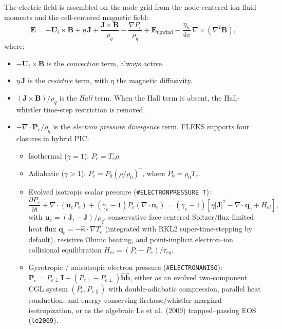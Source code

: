 \documentclass[a4paper, 11pt]{article}
\begin{document}
The electric field is assembled on the node grid from the node-centered ion fluid moments and the cell-centered magnetic field:
\begin{equation}
\mathbf{E} = -\mathbf{U}_i \times \mathbf{B}
           + \eta\,\mathbf{J}
           + \frac{\mathbf{J} \times \mathbf{B}}{\rho_q}
           - \frac{\nabla P_e}{\rho_q}
           + \mathbf{E}_{\text{upwind}}
           - \frac{\eta_h}{4\pi}\,\nabla \times (\nabla^2 \mathbf{B}),
\label{eq:ohmslaw}
\end{equation}
where:
\begin{itemize}
  \item $-\mathbf{U}_i \times \mathbf{B}$ is the \emph{convection} term, always active.
  \item $\eta\,\mathbf{J}$ is the \emph{resistive} term, with $\eta$ the magnetic diffusivity.
  \item $(\mathbf{J}\times\mathbf{B})/\rho_q$ is the \emph{Hall} term. When the Hall term is absent, the Hall-whistler time-step restriction is removed.
  \item $-\nabla\cdot\mathbf{P}_e/\rho_q$ is the \emph{electron pressure divergence} term. FLEKS supports four closures in hybrid PIC:
  \begin{itemize}
    \item Isothermal ($\gamma=1$): $P_e = T_e \rho$.
    \item Adiabatic ($\gamma > 1$): $P_e = P_0 (\rho/\rho_0)^\gamma$, where $P_0 = \rho_0 T_e$.
    \item Evolved isotropic scalar pressure (\texttt{\#ELECTRONPRESSURE T}):
    \begin{equation}
    \frac{\partial P_e}{\partial t} + \nabla\cdot(\mathbf{u}_e P_e) + (\gamma_e - 1) P_e (\nabla\cdot\mathbf{u}_e) = (\gamma_e - 1)\left[\eta |\mathbf{J}|^2 - \nabla\cdot\mathbf{q}_e + H_{ei}\right],
    \end{equation}
    with $\mathbf{u}_e = (\mathbf{J}_i - \mathbf{J})/\rho_q$, conservative face-centered Spitzer/flux-limited heat flux $\mathbf{q}_e = -\hat{\boldsymbol{\kappa}}\cdot\nabla T_e$ (integrated with RKL2 super-time-stepping by default), resistive Ohmic heating, and point-implicit electron--ion collisional equilibration $H_{ei} = (P_i - P_e)/\tau_{eq}$.
    \item Gyrotropic / anisotropic electron pressure (\texttt{\#ELECTRONANISO}): $\mathbf{P}_e = P_{e\perp}\mathbf{I} + (P_{e\parallel} - P_{e\perp})\hat{\mathbf{b}}\hat{\mathbf{b}}$, either as an evolved two-component CGL system $(P_e, P_{e\parallel})$ with double-adiabatic compression, parallel heat conduction, and energy-conserving firehose/whistler marginal isotropization, or as the algebraic Le et al.\ (2009) trapped--passing EOS (\texttt{le2009}).

\end{itemize}
\end{itemize}
\end{document}
